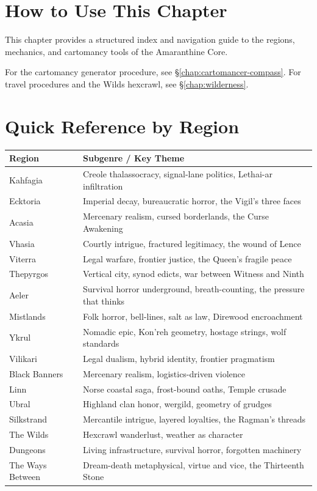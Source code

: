 \documentclass[12pt,oneside]{book}
\newcommand{\secref}[1]{§\ref{#1}}
\begin{document}
\section*{How to Use This Chapter}

This chapter provides a structured index and navigation guide to the regions, mechanics, and cartomancy tools of the Amaranthine Core.

\medskip
\noindent
For the cartomancy generator procedure, see \secref{chap:cartomancer-compass}. For travel procedures and the Wilds hexcrawl, see \secref{chap:wilderness}.

\section{Quick Reference by Region}

\begin{center}
\begin{tabular}{|l|l|}
\hline
\textbf{Region} & \textbf{Subgenre / Key Theme} \\
\hline
Kahfagia & Creole thalassocracy, signal-lane politics, Lethai-ar infiltration \\
Ecktoria & Imperial decay, bureaucratic horror, the Vigil's three faces \\
Acasia & Mercenary realism, cursed borderlands, the Curse Awakening \\
Vhasia & Courtly intrigue, fractured legitimacy, the wound of Lence \\
Viterra & Legal warfare, frontier justice, the Queen's fragile peace \\
Thepyrgos & Vertical city, synod edicts, war between Witness and Ninth \\
Aeler & Survival horror underground, breath-counting, the pressure that thinks \\
Mistlands & Folk horror, bell-lines, salt as law, Direwood encroachment \\
Ykrul & Nomadic epic, Kon'reh geometry, hostage strings, wolf standards \\
Vilikari & Legal dualism, hybrid identity, frontier pragmatism \\
Black Banners & Mercenary realism, logistics-driven violence \\
Linn & Norse coastal saga, frost-bound oaths, Temple crusade \\
Ubral & Highland clan honor, wergild, geometry of grudges \\
Silkstrand & Mercantile intrigue, layered loyalties, the Ragman's threads \\
The Wilds & Hexcrawl wanderlust, weather as character \\
Dungeons & Living infrastructure, survival horror, forgotten machinery \\
The Ways Between & Dream-death metaphysical, virtue and vice, the Thirteenth Stone \\
\hline
\end{tabular}
\end{center}
\end{document}
